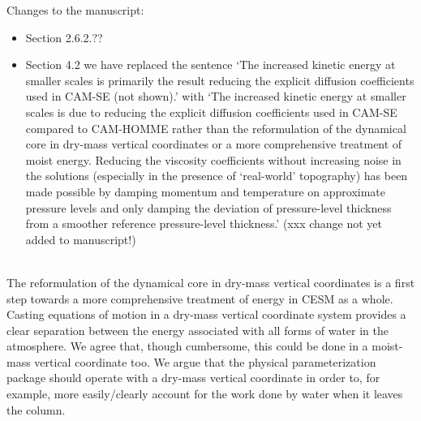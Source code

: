 \documentclass[11pt]{article}
\begin{document}
Changes to the manuscript: 
\begin{itemize}
\item Section 2.6.2.??
\item Section 4.2 we have replaced the sentence `The increased kinetic energy at smaller scales is primarily the result reducing the explicit diffusion coefficients used in CAM-SE (not shown).' with `The increased kinetic energy at smaller scales is due to reducing the explicit diffusion coefficients used in CAM-SE compared to CAM-HOMME rather than the reformulation of the dynamical core in dry-mass vertical coordinates or a more comprehensive treatment of moist energy. Reducing the viscosity coefficients without increasing noise in the solutions (especially in the presence of `real-world' topography) has been made possible by damping momentum and temperature on approximate pressure levels and only damping the deviation of pressure-level thickness from a smoother reference pressure-level thickness.' (xxx change not yet added to manuscript!)
\end{itemize}

{\color{red}{
While interesting from a design standpoint, I am not convinced that the change from moist-mass to a dry-mass vertical coordinate represents an improvement to the model, despite the great effort that would be required for this change, inside and outside of the core. The main justification given is that it makes a number of parts of the model ``easier'', although it is not clear that this is the case. While it may eliminate the need to rescale tracer masses, now the mass effect of water vapor and the condensates needs to be explicitly added in when computing the pressure-gradient force, among other considerations. It is also mentioned in Section 4.2 that many parts of the physics would need to be re-written to work with dry mass; most notably, the use of dry mass leads to the inequality of the hydrostatic assumption in (47), which is a very common assumption in models (presumably more common than the assumption that pressure surfaces do not change). }}\\

The reformulation of the dynamical core in dry-mass vertical coordinates is a first step towards a more comprehensive treatment of energy in CESM as a whole. Casting equations of motion in a dry-mass vertical coordinate system provides a clear separation between the energy associated with all forms of water in the atmosphere. We agree that, though cumbersome, this could be done in a moist-mass vertical coordinate too. We argue that the physical parameterization package should operate with a dry-mass vertical coordinate in order to, for example, more easily/clearly account for the work done by water when it leaves the column.\\
\end{document}
